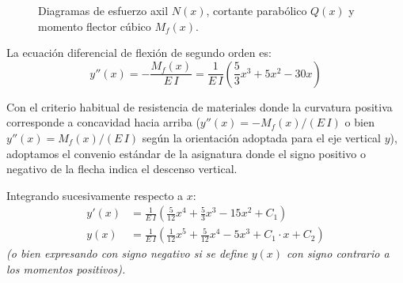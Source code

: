 \begin{figure}[H]
{%
    }
    \caption{Diagramas de esfuerzo axil $N(x)$, cortante parabólico $Q(x)$ y momento flector cúbico $M_f(x)$.}
    \label{fig:examen_viga_trapezoidal_diagramas}
\end{figure}


La ecuación diferencial de flexión de segundo orden es:
\begin{equation}
    y''(x) = -\frac{M_f(x)}{E\,I} = \frac{1}{E\,I}\left( \frac{5}{3}x^3 + 5x^2 - 30x \right)
\end{equation}
\begin{tcolorbox}[colback=yellow!10!white,colframe=orange!80!black,title=\textbf{Convenio de Signos de la Elástica}]
    Con el criterio habitual de resistencia de materiales donde la curvatura positiva corresponde a concavidad hacia arriba ($y''(x) = -M_f(x)/(E\,I)$ o bien $y''(x) = M_f(x)/(E\,I)$ según la orientación adoptada para el eje vertical $y$), adoptamos el convenio estándar de la asignatura donde el signo positivo o negativo de la flecha indica el descenso vertical.
\end{tcolorbox}

Integrando sucesivamente respecto a $x$:
\begin{align}
    y'(x) & = \frac{1}{E\,I}\left( \frac{5}{12}x^4 + \frac{5}{3}x^3 - 15x^2 + C_1 \right) \\[6pt]
    y(x)  & = \frac{1}{E\,I}\left( \frac{1}{12}x^5 + \frac{5}{12}x^4 - 5x^3 + C_1 \cdot x + C_2 \right)
\end{align}
\textit{(o bien expresando con signo negativo si se define $y(x)$ con signo contrario a los momentos positivos).}

